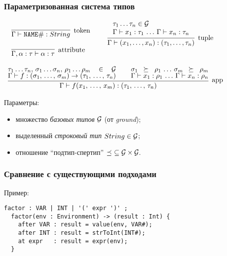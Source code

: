 \documentclass{beamer}
\newcommand{\term}[1]{\emph{#1}}
\newcommand{\myinfer}[3][]{\infer[\mbox{#1}]{#2}{#3}}
\newcommand{\trule}[3]{%
\myinfer[#3]{#2}{#1}%
}%
\begin{document}
\begin{frame}
	\frametitle{Параметризованная система типов}

\noindent
$\begin{array}{lll}

	\begin{array}{l}
		\trule{}{\Gamma \vdash \mathtt{NAME\#} : \Str}{token}\\
		\\
		\trule{}{\Gamma, \alpha : \tau \vdash \alpha : \tau }{attribute}\\
	\end{array}
&&
\trule{
\begin{array}{l}
	\tau_1 \ldots\tau_n \in \G\\
	\Gamma \vdash x_1 : \tau_1 \, \ldots \, \Gamma \vdash x_n : \tau_n
\end{array}
}{
	\Gamma \vdash (x_1, \ldots, x_n) : (\tau_1, \ldots, \tau_n)
}{tuple}

\\
&&\hspace{10pt}\\
\multicolumn{3}{c}{
\trule{	
		\tau_1 \ldots\tau_n,\, \sigma_1 \ldots \sigma_n,\, \rho_1 \ldots \rho_m \in \G
		&\,&
		\sigma_1 \gel \rho_1\,\ldots\, \sigma_m \gel \rho_m\\
		\Gamma \vdash f : (\sigma_1,\,\ldots,\,\sigma_m) \rightarrow (\tau_1,\,\ldots,\,\tau_n)
		&\,&
		\Gamma \vdash x_1 : \rho_1 \, \ldots \, \Gamma \vdash x_n : \rho_n\\
}{\Gamma \vdash f(x_1,\,\ldots,\,x_m) : (\tau_1,\,\ldots,\,\tau_n)}{app}
}
\end{array}$

Параметры:
\begin{itemize}
\item множество \term{базовых типов} ${\mathcal{G}_{}}$ (от \emph{ground});
\item выделенный \term{строковый тип} $String_{} \in {\mathcal{G}_{}}$;
\item отношение ``подтип-спертип'' $\preceq_{} \;\subseteq {\mathcal{G}_{}} \times {\mathcal{G}_{}}$.
\end{itemize}

\end{frame}


\begin{frame}[fragile]
	\frametitle{Сравнение с существующими подходами}
	


Пример:
\begin{lstlisting}[language=Grammatic]
factor : VAR | INT | '(' expr ')' ;           
  factor(env : Environment) -> (result : Int) { 
    after VAR : result = value(env, VAR#);
    after INT : result = strToInt(INT#);
    at expr   : result = expr(env);     
  }
\end{lstlisting}

\end{frame}
\end{document}
